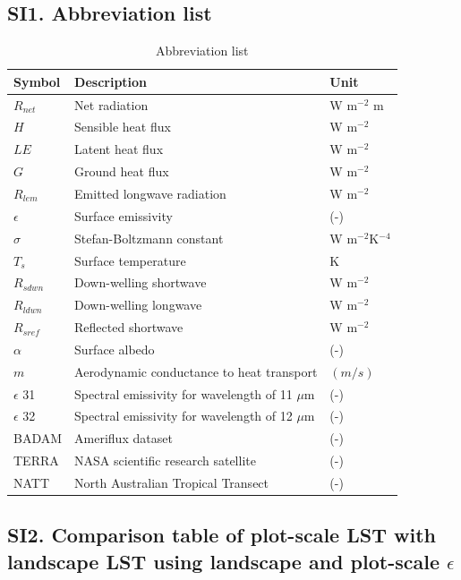 \documentclass[fleqn,10pt]{wlscirep}
\begin{document}
\subsection*{SI1. Abbreviation list}
\begin{table}[h!]

\centering
\caption{Abbreviation list}
\begin{tabular}{p{2.5cm} p{4.0cm} p{3.0cm}}

\hline

Symbol & Description & Unit\\

\hline
$R_{net}$ & Net radiation & W m$^{-2}$ m \\
$H$ & Sensible heat flux & W m$^{-2}$ \\
$LE$ & Latent heat flux & W m$^{-2}$ \\
$G$ & Ground heat flux & W m$^{-2}$ \\
$R_{lem}$ & Emitted longwave radiation & W m$^{-2}$ \\
$\epsilon$ & Surface emissivity & (-)\\
$\sigma$ & Stefan-Boltzmann constant & W m$^{-2}$K$^{-4}$\\
$T_{s}$ & Surface temperature & K\\
$R_{sdwn}$ & Down-welling shortwave & W m$^{-2}$\\
$R_{ldwn}$ & Down-welling longwave & W m$^{-2}$\\
$R_{sref}$ & Reflected shortwave & W m$^{-2}$\\
$\alpha$ & Surface albedo & (-)\\
$m$ & Aerodynamic conductance to heat transport & $(m/s)$\\
$\epsilon$ 31 & Spectral emissivity for wavelength of 11 $\mu$m & (-) \\
$\epsilon$ 32 & Spectral emissivity for wavelength of 12 $\mu$m & (-)  \\
BADAM & Ameriflux dataset & (-) \\
TERRA & NASA scientific research satellite & (-)  \\
NATT & North Australian Tropical Transect & (-) \\

\hline
\end{tabular}
\label{table:SI2}
\end{table}

\subsection*{SI2. Comparison table of plot-scale LST with landscape LST using landscape and plot-scale $\epsilon$}
\end{document}
